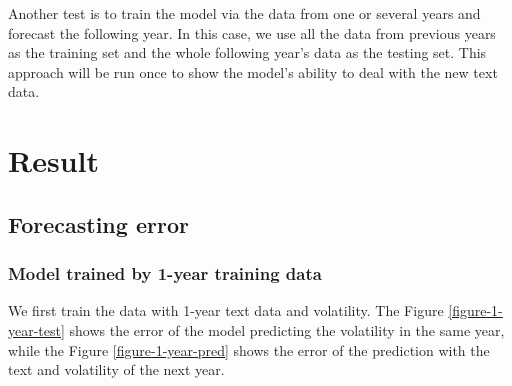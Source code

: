 \documentclass[11pt]{article}
\begin{document}
Another test is to train the model via the data from one or several years and forecast the following year. In this case, we use all the data from previous years as the training set and the whole following year's data as the testing set. This approach will be run once to show the model's ability to deal with the new text data.

\section{Result}

\subsection{Forecasting error}

\subsubsection{Model trained by 1-year training data}

We first train the data with 1-year text data and volatility. The Figure \ref{figure-1-year-test} shows the error of the model predicting the volatility in the same year, while the Figure \ref{figure-1-year-pred} shows the error of the prediction with the text and volatility of the next year.
\end{document}
